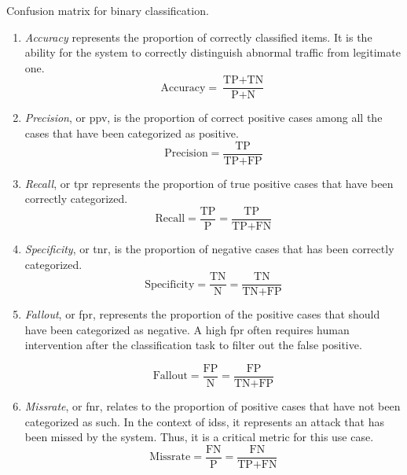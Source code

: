 \begin{table}
  \centering
  
  \caption{
    Confusion matrix for binary classification.
    \label{tbl:bg.conf}
  }
\end{table}

\begin{enumerate}[(1)]
  \item \emph{Accuracy} represents the proportion of correctly classified items.
  It is the ability for the system to correctly distinguish abnormal traffic from legitimate one.
  \begin{equation*}
    \text{Accuracy} = \frac{\text{TP}+\text{TN}}{\text{P}+\text{N}}
  \end{equation*}

  \item \emph{Precision}, or \gls{ppv}, is the proportion of correct positive cases among all the cases that have been categorized as positive.
  \begin{equation*}
    \text{Precision} = \frac{\text{TP}}{\text{TP}+\text{FP}}
  \end{equation*}

  \item \emph{Recall}, or \gls{tpr} represents the proportion of true positive cases that have been correctly categorized.
  \begin{equation*}
    \text{Recall} = \frac{\text{TP}}{\text{P}} = \frac{\text{TP}}{\text{TP}+\text{FN}}
  \end{equation*}

  \item \emph{Specificity}, or \gls{tnr}, is the proportion of negative cases that has been correctly categorized.
  \begin{equation*}
    \text{Specificity} = \frac{\text{TN}}{\text{N}} = \frac{\text{TN}}{\text{TN}+\text{FP}}
  \end{equation*}

  \item \emph{Fallout}, or \gls{fpr}, represents the proportion of the positive cases that should have been categorized as negative.
  A high \gls{fpr} often requires human intervention after the classification task to filter out the false positive.

  \begin{equation*}
    \text{Fallout} = \frac{\text{FP}}{\text{N}} = \frac{\text{FP}}{\text{TN}+\text{FP}}
  \end{equation*}

  \item \emph{Missrate}, or \gls{fnr}, relates to the proportion of positive cases that have not been categorized as such.
  In the context of \glspl{ids}, it represents an attack that has been missed by the system.
  Thus, it is a critical metric for this use case.
  \begin{equation*}
    \text{Missrate} = \frac{\text{FN}}{\text{P}} = \frac{\text{FN}}{\text{TP}+\text{FN}}
  \end{equation*}


\end{enumerate}
